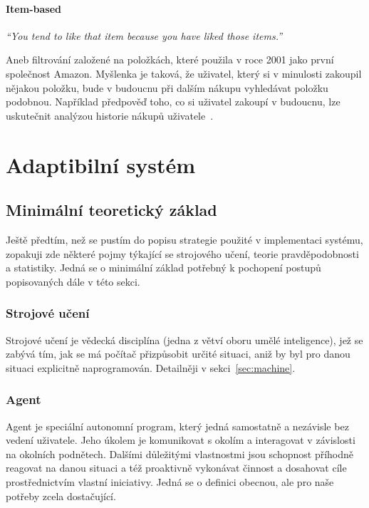 \documentclass[thesis=M,czech]{FITthesis}[2014/05/07]
\begin{document}
\subsubsection{Item-based}

\emph{``You tend to like that item because you have liked those items.''}~\cite{cf}

Aneb filtrování založené na položkách, které použila v roce 2001 jako první společnost Amazon. Myšlenka je taková, že uživatel, který si v minulosti zakoupil nějakou položku, bude v budoucnu při dalším nákupu vyhledávat položku podobnou. Například předpověď toho, co si uživatel zakoupí v budoucnu, lze uskutečnit analýzou historie nákupů uživatele~\cite{itemcf}. 

\chapter{Adaptibilní systém}
\label{chap:adapt}

\section{Minimální teoretický základ}

Ještě předtím, než se pustím do popisu strategie použité v implementaci systému, zopakuji zde některé pojmy týkající se strojového učení, teorie pravděpodobnosti a statistiky. Jedná se o minimální základ potřebný k pochopení postupů popisovaných dále v této sekci. 

\subsection{Strojové učení}
Strojové učení je vědecká disciplína (jedna z větví oboru umělé inteligence), jež se zabývá tím, jak se má počítač přizpůsobit určité situaci, aniž by byl pro danou situaci explicitně naprogramován. Detailněji v sekci~\ref{sec:machine}.

\subsection{Agent}
\label{agent}
Agent je speciální autonomní program, který jedná samostatně a nezávisle bez vedení uživatele. Jeho úkolem je komunikovat s okolím a interagovat v závislosti na okolních podnětech. Dalšími důležitými vlastnostmi jsou schopnost příhodně reagovat na danou situaci a též proaktivně vykonávat činnost a dosahovat cíle prostřednictvím vlastní iniciativy. Jedná se o definici obecnou, ale pro naše potřeby zcela dostačující.
\end{document}
